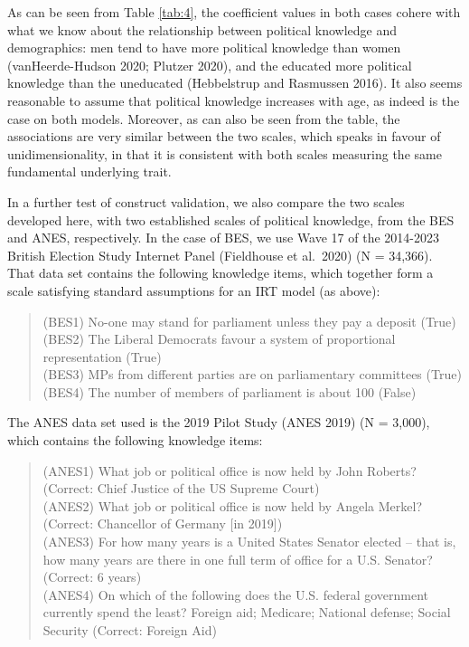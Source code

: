 \documentclass[12pt,halfline,a4paper,]{ouparticle}
\begin{document}
As can be seen from Table \ref{tab:4}, the coefficient values in both
cases cohere with what we know about the relationship between political
knowledge and demographics: men tend to have more political knowledge
than women (vanHeerde-Hudson 2020; Plutzer 2020), and the educated more
political knowledge than the uneducated (Hebbelstrup and Rasmussen
2016). It also seems reasonable to assume that political knowledge
increases with age, as indeed is the case on both models. Moreover, as
can also be seen from the table, the associations are very similar
between the two scales, which speaks in favour of unidimensionality, in
that it is consistent with both scales measuring the same fundamental
underlying trait.

In a further test of construct validation, we also compare the two
scales developed here, with two established scales of political
knowledge, from the BES and ANES, respectively. In the case of BES, we
use Wave 17 of the 2014-2023 British Election Study Internet Panel
(Fieldhouse et al.~2020) (N = 34,366). That data set contains the
following knowledge items, which together form a scale satisfying
standard assumptions for an IRT model (as above):

\begin{quote}
(BES1) No-one may stand for parliament unless they pay a deposit
(True)\\
(BES2) The Liberal Democrats favour a system of proportional
representation (True)\\
(BES3) MPs from different parties are on parliamentary committees
(True)\\
(BES4) The number of members of parliament is about 100 (False)
\end{quote}

The ANES data set used is the 2019 Pilot Study (ANES 2019) (N = 3,000),
which contains the following knowledge items:

\begin{quote}
(ANES1) What job or political office is now held by John Roberts?
(Correct: Chief Justice of the US Supreme Court)\\
(ANES2) What job or political office is now held by Angela Merkel?
(Correct: Chancellor of Germany {[}in 2019{]})\\
(ANES3) For how many years is a United States Senator elected -- that
is, how many years are there in one full term of office for a U.S.
Senator? (Correct: 6 years)\\
(ANES4) On which of the following does the U.S. federal government
currently spend the least? Foreign aid; Medicare; National defense;
Social Security (Correct: Foreign Aid)
\end{quote}
\end{document}
